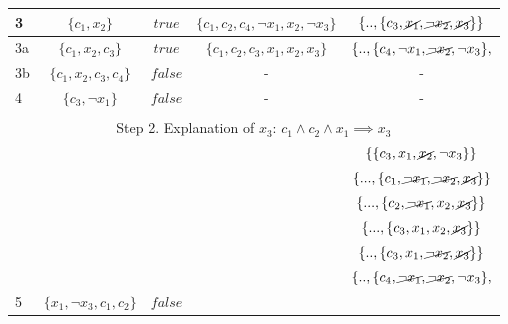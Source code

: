 \documentclass[twoside,11pt]{article}
\begin{document}
\begin{table}[!h]
\begin{tabular}{lcccc}
	\midrule[1pt]
	3                    & $\{ c_1, x_2\}$                     & $\mathit{true}$  & $\{ c_1 , c_2, c_4, \lnot x_1, x_2, \lnot x_3 \}$      & $\{  .., \{ c_3, \cancel{x_1}, \cancel{\lnot x_2}, \cancel{x_3  }\} \}$ \\
	\midrule[0.5pt]
	3a                   & $\{ c_1, x_2, c_3 \}$               & $\mathit{true}$  & $\{ c_1 , c_2, c_3,  x_1, x_2, x_3 \}$                 & $\{  .., \{ c_4 , \lnot x_1, \cancel{\lnot x_2}, \lnot x_3 \},$         \\
	\midrule[0.5pt]
	3b                   & $\{ c_1, x_2, c_3, c_4 \}$          & $\mathit{false}$ & -                                                      & -                                                                       \\
	\midrule[1pt]
	4                    & $\{ c_3, \lnot x_1\}$               & $\mathit{false}$ & -                                                      & -                                                                       \\		\\		
	\multicolumn{5}{c}{Step 2. Explanation of $x_3$: $c_1 \wedge c_2 \wedge x_1 \implies x_3$}\\
	\toprule[2pt]

	  &  &  &   &   $\{ \{c_3, x_1, \cancel{x_2}, \lnot x_3 \}\}$                                                               \\
						 &  &                                                     &  & $\{ ..., \{ c_1, \cancel{\lnot x_1}, \cancel{\lnot x_2}, \cancel{x_3} \}\}$\\
						 &  &                                                    &   &   $\{  ..., \{c_2, \cancel{\lnot x_1} , {x_2}, \cancel{x_3} \} \}$       \\
						 &  &                                                    &   &  $\{ ..., \{ c_3, x_1, {x_2}, \cancel{x_3}\} \}$         \\
						 &  &                                                    &   &  $\{  .., \{ c_3, x_1, \cancel{\lnot x_2}, \cancel{x_3  }\} \}$\\
						 &  &                                                    &   & $\{  .., \{ c_4 , \cancel{\lnot x_1}, \cancel{\lnot x_2}, \lnot x_3 \},$\\
	5  & $\{ x_1 , \lnot x_3 , c_1 , c_2 \}$ & $\mathit{false}$ &   & \\
	

\end{tabular}
\end{table}
\end{document}
